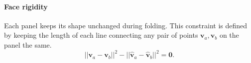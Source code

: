 

\paragraph{Face rigidity} 
Each panel keeps its shape unchanged during folding. This constraint is defined by keeping the length of each line connecting any pair of points $\mathbf{v}_{a}, \mathbf{v}_{b}$ on the panel the same.
\begin{equation}
||\mathbf{v}_{a} - \mathbf{v}_{b}||^2 - ||\hat{\mathbf{v}}_{a} - \hat{\mathbf{v}}_{b}||^2 = \mathbf{0}.
\label{equ:plane}
\end{equation}





